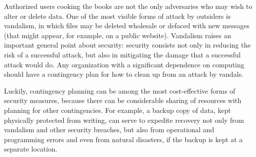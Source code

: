 Authorized users cooking the books are not the only adversaries who
may wish to alter or delete data.  One of the most visible forms of
attack by outsiders is vandalism, in which files may be deleted
wholesale or defaced with new messages (that might appear, for example, on a public website).  Vandalism
raises an important general point about security: security consists
not only in reducing the risk of a successful attack, but also in
mitigating the damage that a successful attack would do.  Any
organization with a significant dependence on computing should have a
contingency plan for how to clean up from an attack by vandals.

Luckily, contingency planning can be among the most cost-effective
forms of security measures, because there can be considerable sharing
of resources with planning for other contingencies.  For example, a
backup copy of data, kept physically protected from writing, can serve
to expedite recovery not only from vandalism and other security
breaches, but also from operational and programming errors and even
from natural disasters, if the backup is kept at a separate location.

